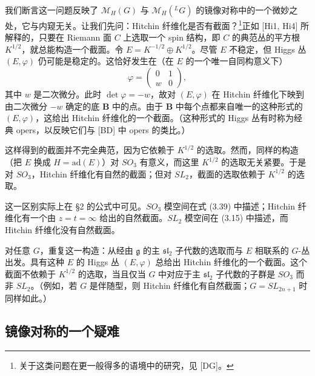 \documentclass[11pt,a4paper]{article}
\begin{document}
我们断言这一问题反映了 $\mathcal{M}_H(G)$ 与 $\mathcal{M}_H({}^{L}G)$ 的镜像对称中的一个微妙之处，它与内窥无关。让我们先问：Hitchin 纤维化是否有截面？\footnote{关于这类问题在更一般得多的语境中的研究，见 [DG]。}正如 [Hi1, Hi4] 所解释的，只要在 Riemann 面 $C$ 上选取一个 spin 结构，即 $C$ 的典范丛的平方根 $K^{1/2}$，就总能构造一个截面。令 $E=K^{-1/2}\oplus K^{1/2}$。尽管 $E$ 不稳定，但 Higgs 丛 $(E,\varphi)$ 仍可能是稳定的。这恰好发生在（在 $E$ 的一个唯一自同构意义下）
\begin{equation}\tag{10.1}
\varphi = \begin{pmatrix}0&1\\ w&0\end{pmatrix},
\end{equation}
其中 $w$ 是二次微分。此时 $\det\varphi=-w$，故对 $(E,\varphi)$ 在 Hitchin 纤维化下映到由二次微分 $-w$ 确定的底 $\boldsymbol{B}$ 中的点。由于 $\boldsymbol{B}$ 中每个点都来自唯一的这种形式的 $(E,\varphi)$，这给出 Hitchin 纤维化的一个截面。（这种形式的 Higgs 丛有时称为经典 opers，以反映它们与 [BD] 中 opers 的类比。）

这样得到的截面并不完全典范，因为它依赖于 $K^{1/2}$ 的选取。然而，同样的构造（把 $E$ 换成 $H=\mathrm{ad}(E)$）对 $SO_3$ 有意义，而这里 $K^{1/2}$ 的选取无关紧要。于是对 $SO_3$，Hitchin 纤维化有自然的截面；但对 $SL_2$，截面的选取依赖于 $K^{1/2}$ 的选取。

这一区别实际上在 §2 的公式中可见。$SO_3$ 模空间在式 (3.39) 中描述；Hitchin 纤维化有一个由 $z=t=\infty$ 给出的自然截面。$SL_2$ 模空间在 (3.15) 中描述，而 Hitchin 纤维化没有自然截面。

对任意 $G$，重复这一构造：从经由 $\mathfrak{g}$ 的主 $\mathfrak{sl}_2$ 子代数的选取而与 $E$ 相联系的 $G$-丛出发。具有这种 $E$ 的 Higgs 丛 $(E,\varphi)$ 总给出 Hitchin 纤维化的一个截面。这个截面不依赖于 $K^{1/2}$ 的选取，当且仅当 $G$ 中对应于主 $\mathfrak{sl}_2$ 子代数的子群是 $SO_3$ 而非 $SL_2$。（例如，若 $G$ 是伴随型，则 Hitchin 纤维化有自然截面；$G=SL_{2n+1}$ 时同样如此。）

\subsection{镜像对称的一个疑难}
\end{document}
